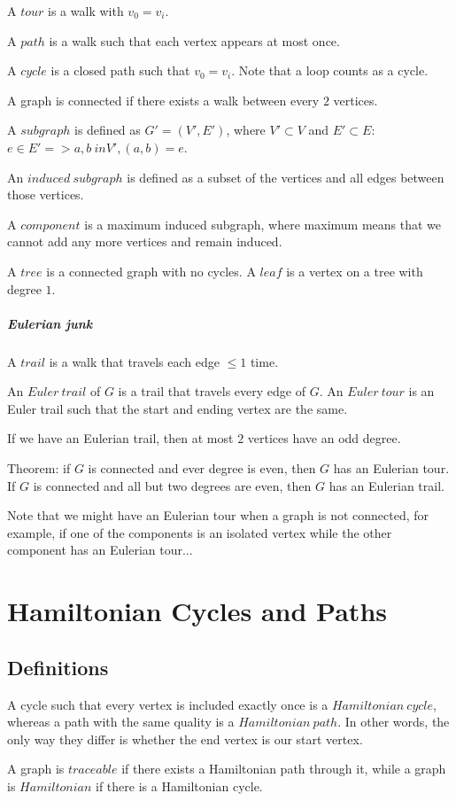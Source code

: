 \documentclass{article}
\begin{document}
A $tour$ is a walk with $v_0 = v_i$.

A $path$ is a walk such that each vertex appears at most once.

A $cycle$ is a closed path such that $v_0 = v_i$. 
Note that a loop counts as a cycle.

A graph is connected if there exists a walk between every $2$ vertices.

A $subgraph$ is defined as $G'=(V', E')$, where $V'\subset V$ and $E'\subset E$: 
$e\in E' => a,b \ in V', (a, b) = e$.

An $induced \ subgraph$ is defined as a subset of the vertices and all edges between those vertices.

A $component$ is a maximum induced subgraph, where maximum means that we cannot add any more vertices
and remain induced.

A $tree$ is a connected graph with no cycles. A $leaf$ is a vertex on a tree with degree $1$.

\subparagraph{Eulerian junk}
A $trail$ is a walk that travels each edge $\leq 1$ time.

An $Euler \ trail$ of $G$ is a trail that travels every edge of $G$.
An $Euler \ tour$ is an Euler trail such that the start and ending vertex are the same.

If we have an Eulerian trail, then at most $2$ vertices have an odd degree.

Theorem: if $G$ is connected and ever degree is even, then $G$ has an Eulerian tour.
If $G$ is connected and all but two degrees are even, then $G$ has an Eulerian trail.

Note that we might have an Eulerian tour when a graph is not connected,
for example, if one of the components is an isolated vertex while the other component has an Eulerian tour...

\section{Hamiltonian Cycles and Paths}
\subsection{Definitions}
A cycle such that every vertex is included exactly once is a $Hamiltonian \ cycle$,
whereas a path with the same quality is a $Hamiltonian \ path$.
In other words, the only way they differ is whether the end vertex is our start vertex.

A graph is $traceable$ if there exists a Hamiltonian path through it, while
a graph is $Hamiltonian$ if there is a Hamiltonian cycle.
\end{document}
